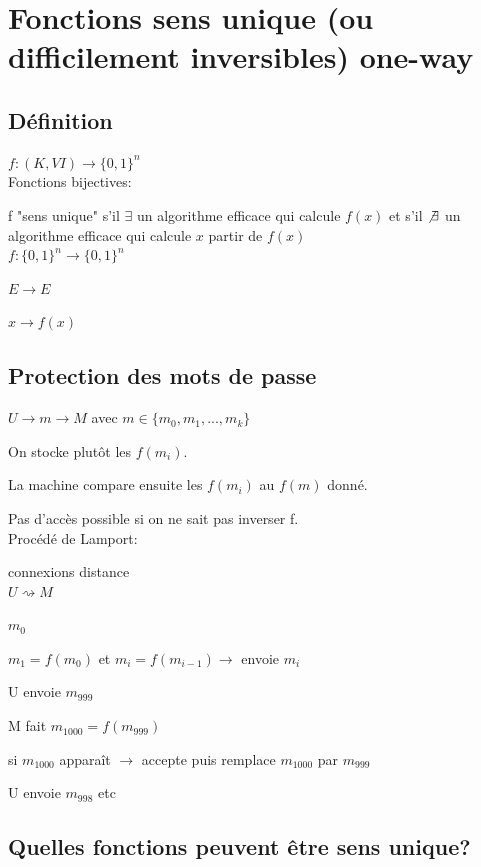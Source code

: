 \documentclass[12pt,a4paper]{article}
\begin{document}
\section{Fonctions sens unique (ou difficilement inversibles) one-way}

\subsection{Définition}

$f:(K,VI)\rightarrow\{0,1\}^n$\\

Fonctions bijectives:

f  "sens unique" s'il $\exists$ un algorithme efficace qui calcule $f(x)$ et s'il $\not\exists$ un algorithme efficace qui calcule $x$  partir de $f(x)$\\

$f:\{0,1\}^n\rightarrow \{0,1\}^n$

$E\rightarrow E$

$x\rightarrow f(x)$\\

\subsection{Protection des mots de passe}

$U\rightarrow m\rightarrow M$ avec $m\in \{m_0,m_1,...,m_k\}$

On stocke plutôt les $f(m_i)$.

La machine compare ensuite les $f(m_i)$ au $f(m)$ donné.

Pas d'accès possible si on ne sait pas inverser f.\\

Procédé de Lamport:

connexions  distance\\

$U \rightsquigarrow M$

$m_0$

$m_1=f(m_0)$ et $m_i=f(m_{i-1}) \rightarrow$ envoie $m_i$

U envoie $m_999$

M fait $m_1000=f(m_999)$

si $m_1000$ apparaît $\rightarrow$ accepte puis remplace $m_1000$ par $m_999$

U envoie $m_998$ etc

\subsection{Quelles fonctions peuvent être  sens unique?}
\end{document}
